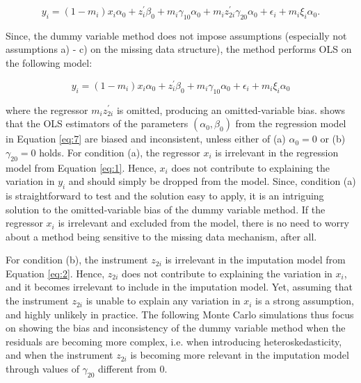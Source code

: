 \begin{equation}\label{eq:6}
    y_i = (1-m_i) x_i \alpha_0 + z_i^{\prime} \beta_0 + m_i \gamma_{10} \alpha_0 + m_i z_{2i}^{\prime} \gamma_{20} \alpha_0 + \epsilon_i + m_i \xi_i \alpha_0.
\end{equation}

Since, the dummy variable method does not impose assumptions (especially not assumptions a) - c) on the missing data structure), the method performs OLS on the following model:

\begin{equation}\label{eq:7}
    y_i = (1-m_i) x_i \alpha_0 + z_i^{\prime} \beta_0 + m_i \gamma_{10} \alpha_0 + \epsilon_i + m_i \xi_i \alpha_0
\end{equation}

where the regressor $m_i z_{2i}^{\prime}$ is omitted, producing an omitted-variable bias.
\citet{jones1996} shows that the OLS estimators of the parameters $(\alpha_0, \beta_0)$ from the regression model in Equation \eqref{eq:7} are biased and inconsistent, unless either of (a) $\alpha_0 = 0$ or (b) $\gamma_{20} = 0$ holds.
For condition (a), the regressor $x_i$ is irrelevant in the regression model from Equation \eqref{eq:1}.
Hence, $x_i$ does not contribute to explaining the variation in $y_i$ and should simply be dropped from the model.
Since, condition (a) is straightforward to test and the solution easy to apply, it is an intriguing solution to the omitted-variable bias of the dummy variable method.
If the regressor $x_i$ is irrelevant and excluded from the model, there is no need to worry about a method being sensitive to the missing data mechanism, after all.

For condition (b), the instrument $z_{2i}$ is irrelevant in the imputation model from Equation \eqref{eq:2}.
Hence, $z_{2i}$ does not contribute to explaining the variation in $x_i$, and it becomes irrelevant to include in the imputation model.
Yet, assuming that the instrument $z_{2i}$ is unable to explain any variation in $x_i$ is a strong assumption, and highly unlikely in practice.
The following Monte Carlo simulations thus focus on showing the bias and inconsistency of the dummy variable method when the residuals are becoming more complex, i.e. when introducing heteroskedasticity, and when the instrument $z_{2i}$ is becoming more relevant in the imputation model through values of $\gamma_{20}$ different from $0$.

